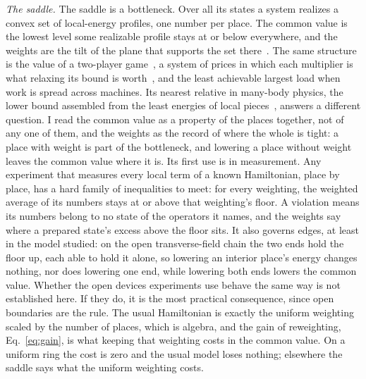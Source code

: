 \documentclass[aps,prd,reprint,superscriptaddress]{revtex4-2}
\begin{document}
\emph{The saddle.} The saddle is a bottleneck. Over all its states a system realizes a convex set of local-energy profiles, one number per place. The common value is the lowest level some realizable profile stays at or below everywhere, and the weights are the tilt of the plane that supports the set there~\cite{BoydVandenberghe2004}. The same structure is the value of a two-player game~\cite{vonNeumann1928}, a system of prices in which each multiplier is what relaxing its bound is worth~\cite{Kantorovich1960}, and the least achievable largest load when work is spread across machines. Its nearest relative in many-body physics, the lower bound assembled from the least energies of local pieces~\cite{Anderson1951}, answers a different question. I read the common value as a property of the places together, not of any one of them, and the weights as the record of where the whole is tight: a place with weight is part of the bottleneck, and lowering a place without weight leaves the common value where it is. Its first use is in measurement. Any experiment that measures every local term of a known Hamiltonian, place by place, has a hard family of inequalities to meet: for every weighting, the weighted average of its numbers stays at or above that weighting's floor. A violation means its numbers belong to no state of the operators it names, and the weights say where a prepared state's excess above the floor sits. It also governs edges, at least in the model studied: on the open transverse-field chain the two ends hold the floor up, each able to hold it alone, so lowering an interior place's energy changes nothing, nor does lowering one end, while lowering both ends lowers the common value. Whether the open devices experiments use behave the same way is not established here. If they do, it is the most practical consequence, since open boundaries are the rule. The usual Hamiltonian is exactly the uniform weighting scaled by the number of places, which is algebra, and the gain of reweighting, Eq.~\eqref{eq:gain}, is what keeping that weighting costs in the common value. On a uniform ring the cost is zero and the usual model loses nothing; elsewhere the saddle says what the uniform weighting costs.
\end{document}
